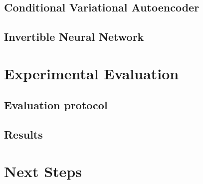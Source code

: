 \documentclass[conference]{IEEEtran}
\begin{document}
\subsection*{Conditional Variational Autoencoder}

\subsection*{Invertible Neural Network}

\section*{Experimental Evaluation}

\subsection*{Evaluation protocol}
\subsection*{Results}


\section*{Next Steps}


\nocite{*}


\end{document}
